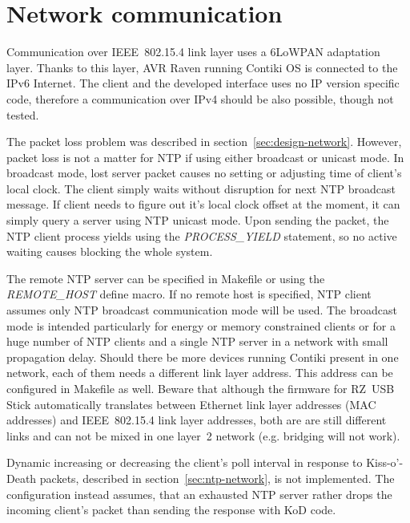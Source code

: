 
\section{Network communication}
Communication over IEEE~802.15.4 link layer uses a 6LoWPAN adaptation layer.
Thanks to this layer, AVR Raven running Contiki OS is connected to the IPv6 Internet.
The client and the developed interface uses no IP version specific code,
therefore a communication over IPv4 should be also possible, though not tested.

The packet loss problem was described in section~\ref{sec:design-network}.
However, packet loss is not a matter for NTP if using either broadcast or unicast mode.
In broadcast mode, lost server packet causes no setting or adjusting time of client's
local clock.
The client simply waits without disruption for next NTP broadcast message.
If client needs to figure out it's local clock offset at the moment,
it can simply query a server using NTP unicast mode.
Upon sending the packet, the NTP client process yields
using the {\it{PROCESS\_YIELD}} statement, so no active waiting
causes blocking the whole system.

The remote NTP server can be specified in Makefile or
using the {\it{REMOTE\_HOST}} define macro.
If no remote host is specified,
NTP client assumes only NTP broadcast communication mode will be used.
The broadcast mode is intended particularly for energy or memory constrained clients
or for a huge number of NTP clients and a single NTP server
in a network with small propagation delay.
Should there be more devices running Contiki present in one network,
each of them needs a different link layer address.
This address can be configured in Makefile as well.
Beware that although the firmware for RZ~USB Stick automatically translates
between Ethernet link layer addresses (MAC addresses) and IEEE~802.15.4 link layer
addresses, both are are still different links and can not be mixed in one
layer~2 network (e.g. bridging will not work).

Dynamic increasing or decreasing the client's poll interval in response to
Kiss-o'-Death packets, described in section~\ref{sec:ntp-network}, is not implemented.
The configuration instead assumes, that an exhausted NTP server rather drops the incoming
client's packet than sending the response with KoD code.

